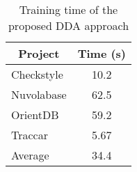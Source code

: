 \begin{table}[t!]
	\centering
	\caption{Training time of the proposed DDA approach}
	\begin{tabular}{|l|c|}
		\hline
		\multicolumn{1}{|c|}{Project} & Time (s) \\
		\hline
		\hline
		Checkstyle & 10.2 \\
		Nuvolabase & 62.5 \\
		OrientDB & 59.2 \\
		Traccar & 5.67 \\
		\hline
		\hline 
		Average & 34.4 \\
		\hline 
	\end{tabular}%
	\label{tab:time}%
\end{table}%


